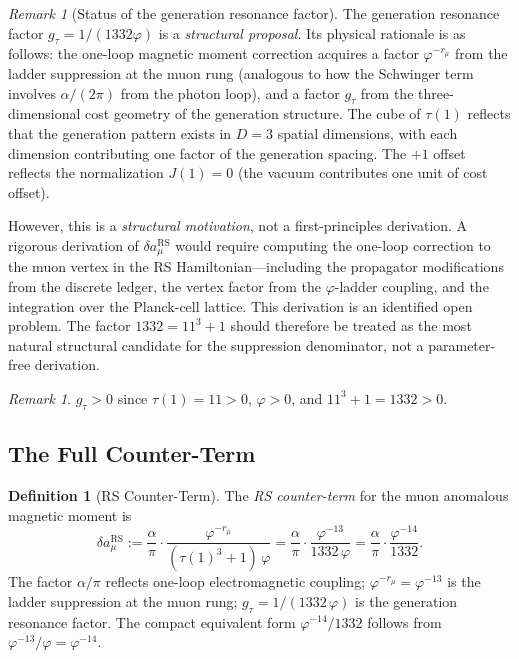 \documentclass[12pt,a4paper]{article}
\theoremstyle{definition}
\newtheorem{definition}[theorem]{Definition}
\theoremstyle{remark}
\newtheorem{remark}[theorem]{Remark}
\begin{document}
\begin{remark}[Status of the generation resonance factor]
\label{rem:resonance-status}
The generation resonance factor $g_\tau = 1/(1332\varphi)$ is a
\emph{structural proposal}.  Its physical rationale is as follows:
the one-loop magnetic moment correction acquires a factor
$\varphi^{-r_\mu}$ from the ladder suppression at the muon rung
(analogous to how the Schwinger term involves $\alpha/(2\pi)$ from
the photon loop), and a factor $g_\tau$ from the three-dimensional
cost geometry of the generation structure.  The cube of $\tau(1)$
reflects that the generation pattern exists in $D = 3$ spatial
dimensions, with each dimension contributing one factor of the
generation spacing.  The $+1$ offset reflects the normalization
$J(1) = 0$ (the vacuum contributes one unit of cost offset).

However, this is a \emph{structural motivation}, not a first-principles
derivation.  A rigorous derivation of $\delta a_\mu^{\mathrm{RS}}$
would require computing the one-loop correction to the muon vertex in
the RS Hamiltonian---including the propagator modifications from the
discrete ledger, the vertex factor from the $\varphi$-ladder coupling,
and the integration over the Planck-cell lattice.  This derivation is
an identified open problem.  The factor $1332 = 11^3 + 1$ should
therefore be treated as the most natural structural candidate for the
suppression denominator, not a parameter-free derivation.
\end{remark}

\begin{remark}
\label{lem:gtau}
$g_{\tau} > 0$ since $\tau(1) = 11 > 0$, $\varphi > 0$, and
$11^3 + 1 = 1332 > 0$.
\end{remark}

\subsection{The Full Counter-Term}

\begin{definition}[RS Counter-Term]
The \emph{RS counter-term} for the muon anomalous magnetic moment is
\begin{equation}
  \boxed{\delta a_\mu^{\mathrm{RS}} := \frac{\alpha}{\pi} \cdot
  \frac{\varphi^{-r_\mu}}{(\tau(1)^3 + 1)\,\varphi}
  = \frac{\alpha}{\pi} \cdot
  \frac{\varphi^{-13}}{1332\,\varphi}
  = \frac{\alpha}{\pi} \cdot \frac{\varphi^{-14}}{1332}.}
  \label{eq:counter-term}
\end{equation}
The factor $\alpha/\pi$ reflects one-loop electromagnetic coupling;
$\varphi^{-r_\mu} = \varphi^{-13}$ is the ladder suppression at the muon rung;
$g_\tau = 1/(1332\,\varphi)$ is the generation resonance factor.
The compact equivalent form $\varphi^{-14}/1332$ follows from
$\varphi^{-13}/\varphi = \varphi^{-14}$.
\end{definition}
\end{document}
